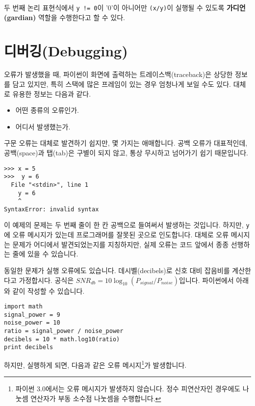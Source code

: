 두 번째 논리 표현식에서 {\tt y != 0}이 '0'이 아니어만 {\tt (x/y)}이 실행될 수 있도록 {\bf 가디언(gardian)} 역할을 수행한다고 할 수 있다.

\section{디버깅(Debugging)}

오류가 발생했을 때, 파이썬이 화면에 출력하는 트레이스백(traceback)은 상당한 정보를 담고 있지만, 특히 스택에 많은 프레임이 있는 경우 엄청나게 보일 수도 있다.
대체로 유용한 정보는 다음과 같다.

\begin{itemize}

\item 어떤 종류의 오류인가.

\item 어디서 발생했는가.

\end{itemize}

구문 오류는 대체로 발견하기 쉽지만, 몇 가지는 애매합니다. 공백 오류가 대표적인데, 공백(space)과 탭(tab)은 구별이 되지 않고,
통상 무시하고 넘어가기 쉽기 때문입니다.


\beforeverb
\begin{verbatim}
>>> x = 5
>>>  y = 6
  File "<stdin>", line 1
    y = 6
    ^
SyntaxError: invalid syntax
\end{verbatim}
\afterverb
%
이 예제의 문제는 두 번째 줄이 한 칸 공백으로 들여써서 발생하는 것입니다. 하지만, {\tt y}에 오류 메시지가 있는데 프로그래머를 잘못된 곳으로 인도합니다. 대체로 오류 메시지는 문제가 어디에서 발견되었는지를 지칭하지만, 실제 오류는 코드 앞에서 종종 선행하는 줄에 있을 수 있습니다.


동일한 문제가 실행 오류에도 있습니다. 데시벨(decibels)로 신호 대비 잡음비를 계산한다고 가정합시다. 공식은 $SNR_{db} = 10 \log_{10} (P_{signal} / P_{noise})$입니다. 파이썬에서 아래와 같이 작성할 수 있습니다.

\beforeverb
\begin{verbatim}
import math
signal_power = 9
noise_power = 10
ratio = signal_power / noise_power
decibels = 10 * math.log10(ratio)
print decibels
\end{verbatim}
\afterverb
%

하지만, 실행하게 되면, 다음과 같은 오류 메시지\footnote{파이썬 3.0에서는 오류 메시지가 발생하지 않습니다.
 정수 피연산자인 경우에도 나눗셈 연산자가 부동 소수점 나눗셈을 수행합니다.}가 발생합니다. 

